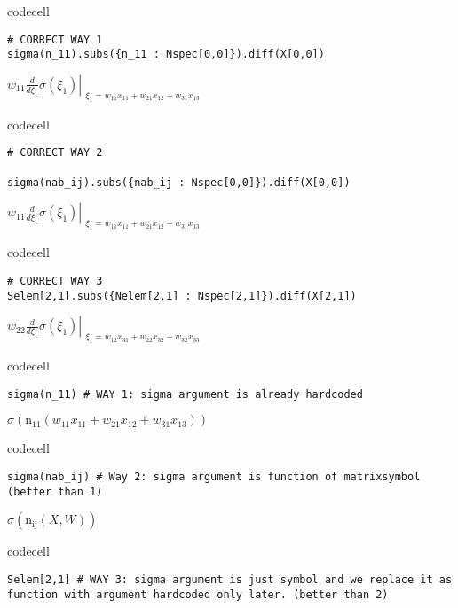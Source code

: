 codecell

\begin{verbatim}
# CORRECT WAY 1
sigma(n_11).subs({n_11 : Nspec[0,0]}).diff(X[0,0])
\end{verbatim}

$\displaystyle w_{11} \left. \frac{d}{d \xi_{1}} \sigma{\left(\xi_{1} \right)} \right|_{\substack{ \xi_{1}=w_{11} x_{11} + w_{21} x_{12} + w_{31} x_{13} }}$

codecell

\begin{verbatim}
# CORRECT WAY 2

sigma(nab_ij).subs({nab_ij : Nspec[0,0]}).diff(X[0,0])
\end{verbatim}

$\displaystyle w_{11} \left. \frac{d}{d \xi_{1}} \sigma{\left(\xi_{1} \right)} \right|_{\substack{ \xi_{1}=w_{11} x_{11} + w_{21} x_{12} + w_{31} x_{13} }}$

codecell

\begin{verbatim}
# CORRECT WAY 3
Selem[2,1].subs({Nelem[2,1] : Nspec[2,1]}).diff(X[2,1])
\end{verbatim}

$\displaystyle w_{22} \left. \frac{d}{d \xi_{1}} \sigma{\left(\xi_{1} \right)} \right|_{\substack{ \xi_{1}=w_{12} x_{31} + w_{22} x_{32} + w_{32} x_{33} }}$

codecell

\begin{verbatim}
sigma(n_11) # WAY 1: sigma argument is already hardcoded
\end{verbatim}

$\displaystyle \sigma{\left(\operatorname{n_{11}}{\left(w_{11} x_{11} + w_{21} x_{12} + w_{31} x_{13} \right)} \right)}$

codecell

\begin{verbatim}
sigma(nab_ij) # Way 2: sigma argument is function of matrixsymbol (better than 1)
\end{verbatim}

$\displaystyle \sigma{\left(\operatorname{n_{ij}}{\left(X,W \right)} \right)}$

codecell

\begin{verbatim}
Selem[2,1] # WAY 3: sigma argument is just symbol and we replace it as function with argument hardcoded only later. (better than 2)
\end{verbatim}

